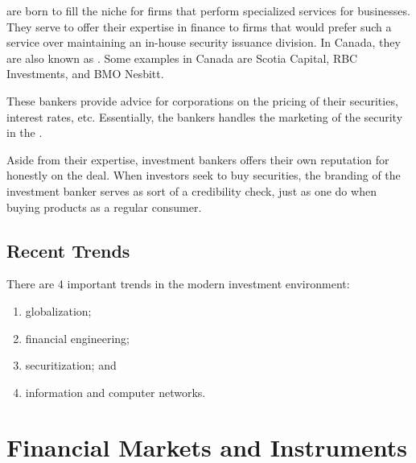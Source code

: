 \documentclass[notoc,notitlepage]{tufte-book}
\begin{document}
\begin{eg}
   are born to fill the niche for
  firms that perform specialized services for businesses.
  They serve to offer their expertise in finance to firms
  that would prefer such a service over
  maintaining an in-house security issuance division.
  In Canada, they are also known as .
  Some examples in Canada are Scotia Capital, RBC Investments,
  and BMO Nesbitt.

  These bankers provide advice for corporations
  on the pricing of their securities, interest rates, etc.
  Essentially, the bankers handles the marketing of the security
  in the . 

  Aside from their expertise, investment bankers offers their own
  reputation for honestly on the deal. When investors seek to buy
  securities, the branding of the investment banker serves
  as sort of a credibility check, just as one do when buying products
  as a regular consumer.
\end{eg}



\section{Recent Trends}%
\label{sec:recent_trends}

There are 4 important trends in the modern investment environment:
\begin{enumerate}
  \item globalization;
  \item financial engineering;
  \item securitization; and
  \item information and computer networks.
\end{enumerate}



\chapter{Financial Markets and Instruments}%
\label{chp:financial_markets_and_instruments}
\end{document}
